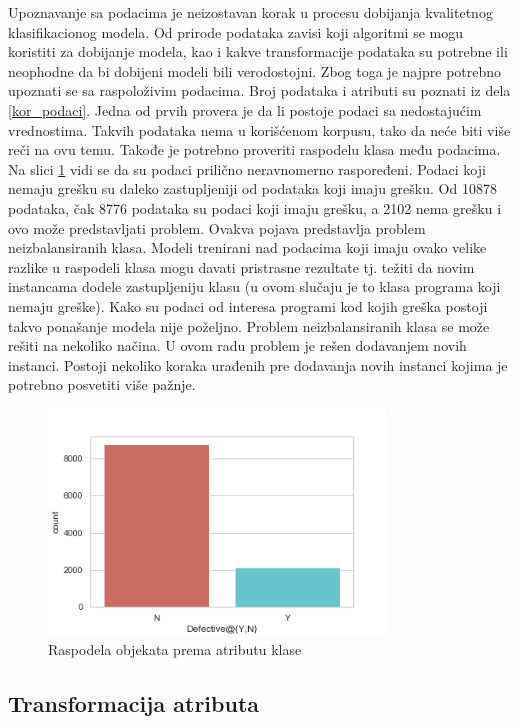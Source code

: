 \documentclass[12pt,oneside]{memoir}
\begin{document}
Upoznavanje sa podacima je neizostavan korak u procesu dobijanja kvalitetnog klasifikacionog modela. Od prirode podataka zavisi koji algoritmi se mogu koristiti za dobijanje modela, kao i kakve transformacije podataka su potrebne ili neophodne da bi dobijeni modeli bili verodostojni.
Zbog toga je najpre potrebno upoznati se sa raspoloživim podacima. Broj podataka i atributi su poznati iz dela \ref{kor_podaci}. Jedna od prvih provera je da li postoje podaci sa nedostajućim vrednostima. Takvih podataka nema u korišćenom korpusu, tako da neće biti više reči na ovu temu. Takođe je potrebno proveriti raspodelu klasa među podacima. Na slici \ref{fig:raspodela} vidi se da su podaci prilično neravnomerno raspoređeni. Podaci koji nemaju grešku su daleko zastupljeniji od podataka koji imaju grešku. Od 10878 podataka, čak 8776 podataka su podaci koji imaju grešku, a 2102 nema grešku i ovo može predstavljati problem. Ovakva pojava predstavlja problem neizbalansiranih klasa. Modeli trenirani nad podacima koji imaju ovako velike razlike u raspodeli klasa mogu davati pristrasne rezultate tj. težiti da novim instancama dodele zastupljeniju klasu (u ovom slučaju je to klasa programa koji nemaju greške). Kako su podaci od interesa programi kod kojih greška postoji takvo ponašanje modela nije poželjno. Problem neizbalansiranih klasa se može rešiti na nekoliko načina. U ovom radu problem je rešen dodavanjem novih instanci. Postoji nekoliko koraka urađenih pre dodavanja novih instanci kojima je potrebno posvetiti više pažnje.  

\begin{figure}[!ht]
  \centering
  \includegraphics[width=0.80\textwidth]{raspodela.png}
  \caption{Raspodela objekata prema atributu klase}
  \label{fig:raspodela}
\end{figure}
	 
\subsection{Transformacija atributa}
\end{document}
